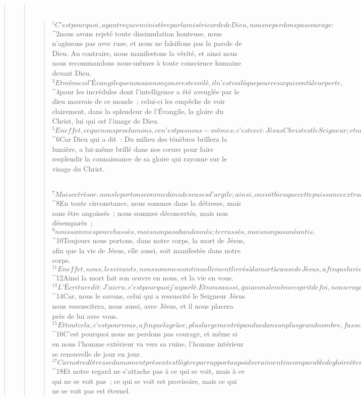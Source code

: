 \begin{verse}
\begin{verse}
         
      \bchapter{}
      \begin{verse}
${}^{1}C’est pourquoi, ayant reçu ce ministère par la miséricorde de Dieu, nous ne perdons pas courage : 
${}^{2}nous avons rejeté toute dissimulation honteuse, nous n’agissons pas avec ruse, et nous ne falsifions pas la parole de Dieu. Au contraire, nous manifestons la vérité, et ainsi nous nous recommandons nous-mêmes à toute conscience humaine devant Dieu. 
${}^{3}Et même si l’Évangile que nous annonçons reste voilé, il n’est voilé que pour ceux qui vont à leur perte, 
${}^{4}pour les incrédules dont l’intelligence a été aveuglée par le dieu mauvais de ce monde ; celui-ci les empêche de voir clairement, dans la splendeur de l’Évangile, la gloire du Christ, lui qui est l’image de Dieu. 
${}^{5}En effet, ce que nous proclamons, ce n’est pas nous-mêmes ; c’est ceci : Jésus Christ est le Seigneur ; et nous sommes vos serviteurs, à cause de Jésus. 
${}^{6}Car Dieu qui a dit : Du milieu des ténèbres brillera la lumière, a lui-même brillé dans nos cœurs pour faire resplendir la connaissance de sa gloire qui rayonne sur le visage du Christ.
      
         
${}^{7}Mais ce trésor, nous le portons comme dans des vases d’argile ; ainsi, on voit bien que cette puissance extraordinaire appartient à Dieu et ne vient pas de nous. 
${}^{8}En toute circonstance, nous sommes dans la détresse, mais sans être angoissés ; nous sommes déconcertés, mais non désemparés ; 
${}^{9}nous sommes pourchassés, mais non pas abandonnés ; terrassés, mais non pas anéantis. 
${}^{10}Toujours nous portons, dans notre corps, la mort de Jésus, afin que la vie de Jésus, elle aussi, soit manifestée dans notre corps. 
${}^{11}En effet, nous, les vivants, nous sommes continuellement livrés à la mort à cause de Jésus, afin que la vie de Jésus, elle aussi, soit manifestée dans notre condition charnelle vouée à la mort. 
${}^{12}Ainsi la mort fait son œuvre en nous, et la vie en vous. 
${}^{13}L’Écriture dit : J’ai cru, c’est pourquoi j’ai parlé. Et nous aussi, qui avons le même esprit de foi, nous croyons, et c’est pourquoi nous parlons. 
${}^{14}Car, nous le savons, celui qui a ressuscité le Seigneur Jésus nous ressuscitera, nous aussi, avec Jésus, et il nous placera près de lui avec vous. 
${}^{15}Et tout cela, c’est pour vous, afin que la grâce, plus largement répandue dans un plus grand nombre, fasse abonder l’action de grâce pour la gloire de Dieu.
${}^{16}C’est pourquoi nous ne perdons pas courage, et même si en nous l’homme extérieur va vers sa ruine, l’homme intérieur se renouvelle de jour en jour. 
${}^{17}Car notre détresse du moment présent est légère par rapport au poids vraiment incomparable de gloire éternelle qu’elle produit pour nous. 
${}^{18}Et notre regard ne s’attache pas à ce qui se voit, mais à ce qui ne se voit pas ; ce qui se voit est provisoire, mais ce qui ne se voit pas est éternel.
      

\end{verse}
\end{verse}
\end{verse}
